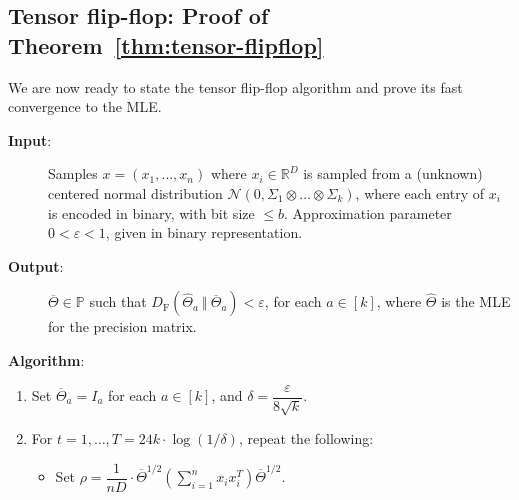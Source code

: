 \documentclass[aos]{imsart}
\theoremstyle{definition}
\numberwithin{equation}{section}
\newcommand{\R}{{\mathbb{R}}}
\newcommand{\otheta}{\overline{\Theta}}
\newcommand{\htheta}{\widehat{\Theta}}
\newcommand{\ot}{\otimes}
\newcommand{\eps}{\varepsilon}
\newcommand{\cN}{\mathcal{N}}
\newcommand{\SPD}{\mathbb{P}}
\newcommand{\samp}{x}
\newcommand{\DF}{D_{\operatorname{F}}}
\begin{document}
\subsection{Tensor flip-flop: Proof of Theorem~\ref{thm:tensor-flipflop}}

We are now ready to state the tensor flip-flop algorithm and prove its fast convergence to the MLE.

\begin{Algorithm}
\begin{description}
\item[\hspace{.2cm}\textbf{Input}:] Samples $\samp = (\samp_1, \ldots, \samp_n)$ where $\samp_i \in \R^D$ is sampled from a (unknown) centered normal distribution $\cN(0, \Sigma_1 \ot \dots \ot \Sigma_k)$, where each entry of $\samp_i$ is encoded in binary, with bit size $\le b$. Approximation parameter $0 < \eps < 1$, given in binary representation. \\[.3ex]

\item[\hspace{.2cm}\textbf{Output}:] $\otheta \in \SPD$ such that $\DF(\htheta_a \ \Vert  \ \otheta_a) < \eps$, for each $a \in [k]$, where $\htheta$ is the MLE for the precision matrix. \\[.3ex]

\item[\hspace{.2cm}\textbf{Algorithm}:]
\end{description}
\begin{enumerate}
\item\label{it:tensor-flip-flop step 1} Set $\otheta_a = I_a$ for each $a \in [k]$, and
$\delta = \dfrac{\eps}{8 \sqrt{k}}$.

\vspace{5pt}

\item\label{it:tensor-flip-flop step 2} For $t=1,\dots,T = 24 k \cdot \log(1/\delta)$, repeat the following:

\vspace{5pt}

\begin{itemize}
\item Set $\rho = \dfrac{1}{nD} \cdot \otheta^{1/2} \left( \sum_{i=1}^n x_ix_i^T \right) \otheta^{1/2}.$


\end{itemize}
\end{enumerate}
\end{Algorithm}
\end{document}
